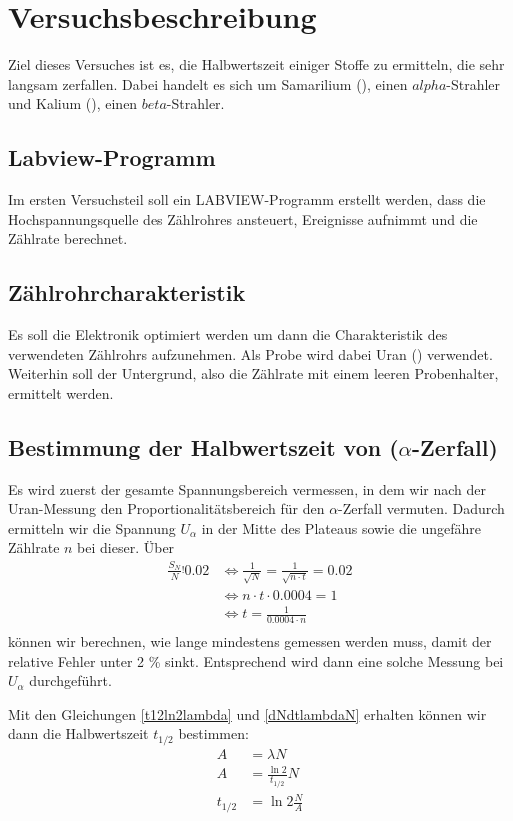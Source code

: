 \section{Versuchsbeschreibung}

Ziel dieses Versuches ist es, die Halbwertszeit einiger Stoffe zu ermitteln, die sehr langsam zerfallen. Dabei handelt es sich um Samarilium (), einen $alpha$-Strahler und Kalium (), einen $beta$-Strahler.

\subsection{Labview-Programm}
Im ersten Versuchsteil soll ein LABVIEW-Programm erstellt werden, dass die Hochspannungsquelle des Zählrohres ansteuert, Ereignisse aufnimmt und die Zählrate berechnet.

\subsection{Zählrohrcharakteristik}
Es soll die Elektronik optimiert werden um dann die Charakteristik des verwendeten Zählrohrs aufzunehmen. Als Probe wird dabei Uran () verwendet. Weiterhin soll der Untergrund, also die Zählrate mit einem leeren Probenhalter, ermittelt werden.

\subsection{Bestimmung der Halbwertszeit von  ($\alpha$-Zerfall)}
Es wird zuerst der gesamte Spannungsbereich vermessen, in dem wir nach der Uran-Messung den Proportionalitätsbereich für den $\alpha$-Zerfall vermuten. Dadurch ermitteln wir die Spannung $U_{\alpha}$ in der Mitte des Plateaus sowie die ungefähre Zählrate $n$ bei dieser. Über
\begin{align}
 \frac{S_N}{N} \stackrel{!}{} 0.02 & \Leftrightarrow \frac{1}{\sqrt{N}} = \frac{1}{\sqrt{n \cdot t}} = 0.02 \\
				   & \Leftrightarrow n \cdot t \cdot 0.0004 = 1 \\
				   & \Leftrightarrow t = \frac{1}{0.0004 \cdot n}\\
\end{align}
können wir berechnen, wie lange mindestens gemessen werden muss, damit der relative Fehler unter 2 \% sinkt. Entsprechend wird dann eine solche Messung bei $U_{\alpha}$ durchgeführt.

Mit den Gleichungen \ref{t12ln2lambda} und \ref{dNdtlambdaN} erhalten können wir dann die Halbwertszeit $t_{1/2}$ bestimmen:
\begin{align}
 A & = \lambda N \\
 A & = \frac{\ln 2}{t_{1/2}}N \\
 t_{1/2} & = \ln 2 \frac{N}{A} \\
\end{align}

